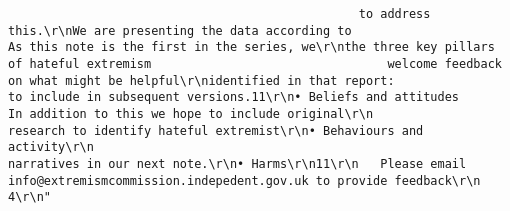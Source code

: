 \documentclass[
]{book}
\begin{document}
\begin{verbatim}
                                                 to address this.\r\nWe are presenting the data according to                                    As this note is the first in the series, we\r\nthe three key pillars of hateful extremism                                 welcome feedback on what might be helpful\r\nidentified in that report:                                                 to include in subsequent versions.11\r\n• Beliefs and attitudes                                                    In addition to this we hope to include original\r\n                                                                           research to identify hateful extremist\r\n• Behaviours and activity\r\n                                                                           narratives in our next note.\r\n• Harms\r\n11\r\n   Please email info@extremismcommission.indepedent.gov.uk to provide feedback\r\n                                                                         4\r\n"                                                                                                                                                                                                                                                                                                                                                                                                                                                                                                                                                                                                                                                                                                                                                                                                                                                                                                                                                                                                                                                                                                                                                                                                                                                                                                                                                                                                                                                                                                                                                                                                                                                                                                                                                                          

\end{verbatim}
\end{document}
